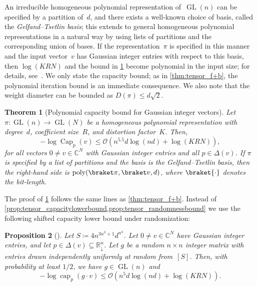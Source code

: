 \documentclass[11pt,letterpaper]{article}
\newtheorem{theorem}{Theorem}[section]
\newtheorem{proposition}[theorem]{Proposition}\AddToHook{env/proposition/begin}{\crefalias{theorem}{proposition}}\crefname{proposition}{Proposition}{Propositions}
\numberwithin{equation}{section}
\newcommand{\RR}{\mathbb{R}}
\newcommand{\CC}{\mathbb{C}}
\DeclareMathOperator{\poly}{poly}
\DeclareMathOperator{\capacity}{cap}
\DeclareMathOperator{\Capacity}{Cap}
\DeclareMathOperator{\GL}{GL}
\begin{document}
An irreducible homogeneous polynomial representation of~$\GL(n)$ can be specified by a partition of~$d$, and there exists a well-known choice of basis, called the \emph{Gelfand--Tsetlin basis}; this extends to general homogeneous polynomial representations in a natural way by using lists of partitions and the corresponding union of bases.
If the representation~$\pi$ is specified in this manner and the input vector~$v$ has Gaussian integer entries with respect to this basis, then $\log(KRN)$ and the bound in \cref{thm:GLn_f+b} become polynomial in the input size; for details, see~\cite[\S{}1.6, \S{}8]{BFGOWW2019}.
We only state the capacity bound; as in \cref{thm:tensor_f+b}, the polynomial iteration bound is an immediate consequence.
We also note that the weight diameter can be bounded as $D(\pi) \leq d \sqrt 2$.

\begin{theorem}[Polynomial capacity bound for Gaussian integer vectors]\label{thm:GLn_f+b}
    Let $\pi \colon \GL(n) \to \GL(N)$ be a homogeneous polynomial representation with degree~$d$, coefficient size~$R$, and distortion factor~$K$.
    Then,
    \[
        -\log\Capacity_p(v) \leq \mathcal{O}(n^{5.5}d\log(nd) + \log(KRN)),
    \]
    for all vectors $0 \neq v \in \CC^N$ with Gaussian integer entries and all $p \in \Delta(v)$.
    If $\pi$ is specified by a list of partitions and the basis is the Gelfand--Tsetlin basis, then the right-hand side is $\poly(\braket\pi,\braket v,d)$, where $\braket{\cdot}$ denotes the bit-length.
\end{theorem}

The proof of \cref{thm:GLn_f+b} follows the same lines as \cref{thm:tensor_f+b}.
Instead of \cref{prop:tensor_capacitylowerbound,prop:tensor_randomnessbound} we use the following shifted capacity lower bound under randomization:

\begin{proposition}[{\cite[Thm.~7.24]{BFGOWW2019}}]\label{prop:GLn_capacitylowerbound}
Let $S \coloneqq 4n^{3n^3 + 1}d^{n^4}$.
Let $0 \neq v \in \CC^N$ have Gaussian integer entries, and let $p \in \Delta(v) \subseteq \RR^n_{\downarrow}$.
Let $g$ be a random $n\times n$ integer matrix with entries drawn independently uniformly at random from~$[S]$.
Then, with probability at least $1/2$, we have $g \in \GL(n)$ and
\begin{equation}\label{eq:capacity_proof1}
    -\log\capacity_p(g\cdot v) \leq \mathcal{O}(n^5 d \log(nd) + \log(KRN)).
\end{equation}
\end{proposition}
\end{document}
